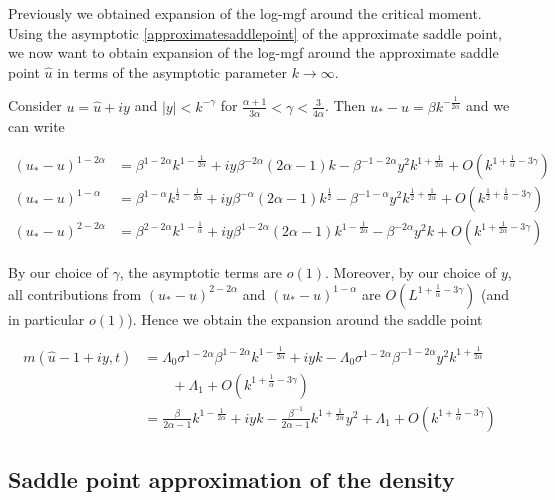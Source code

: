 \documentclass[12pt]{article}
\theoremstyle{plain}
\begin{document}
Previously we obtained expansion of the log-mgf around the critical moment. Using the asymptotic \eqref{approximatesaddlepoint} of the approximate saddle point, we now want to obtain expansion of the log-mgf around the approximate saddle point $\hat u$ in terms of the asymptotic parameter $k\rightarrow \infty$.

Consider $u = \hat u + iy$ and $|y|<k^{-\gamma}$ for $\frac{\alpha+1}{3\alpha}< \gamma < \frac{3}{4\alpha} $. Then $u_*-u=\beta k^{-\frac{1}{2\alpha}}$ and we can write

$$
\begin{array}{ll}
(u_*-u)^{1-2\alpha} &= \beta^{1-2\alpha}k^{1-\frac{1}{2\alpha}} + iy\beta^{-2\alpha}(2\alpha-1)k - \beta^{-1-2\alpha}y^2 k^{1+\frac{1}{2\alpha}} + O(k^{1+\frac 1\alpha -3\gamma})\\[5pt]
(u_*-u)^{1-\alpha} &= \beta^{1-\alpha}k^{\frac 12-\frac{1}{2\alpha}} + iy\beta^{-\alpha}(2\alpha-1)k^{\frac 12} - \beta^{-1-\alpha}y^2 k^{\frac 12+\frac{1}{2\alpha}} + O(k^{\frac 12+\frac 1\alpha-3\gamma})\\[5pt]
(u_*-u)^{2-2\alpha} &= \beta^{2-2\alpha}k^{1-\frac{1}{\alpha}} + iy\beta^{1-2\alpha}(2\alpha-1)k^{1-\frac{1}{2\alpha}} - \beta^{-2\alpha}y^2k + O(k^{1+\frac {1}{2\alpha}-3\gamma})
\end{array}
$$

By our choice of $\gamma$, the asymptotic terms are $o(1)$. Moreover, by our choice of $y$, all contributions from $(u_*-u)^{2-2\alpha}$ and $(u_*-u)^{1-\alpha}$ are $O(L^{1+\frac 1\alpha -3\gamma})$ (and in particular $o(1)$). Hence we obtain the expansion around the saddle point

\begin{equation}\label{logmgfexpansionaroundthesaddlepoint}
\begin{aligned}
m(\hat u - 1 + iy,t)&=\Lambda_0\sigma^{1-2\alpha}\beta^{1-2\alpha}k^{1-\frac{1}{2\alpha}} + iyk - \Lambda_0 \sigma ^{1-2\alpha} \beta^{-1-2\alpha} y^2 k^{1 + \frac{1}{2\alpha}} \\
&\qquad+ \Lambda_1 + O(k^{1+\frac 1\alpha -3\gamma})\\[10pt]
&=\frac{\beta}{2\alpha - 1} k ^ {1-\frac{1}{2\alpha}} + iyk - \frac{\beta^{-1}}{2\alpha - 1} k ^{1+\frac{1}{2\alpha}} y^2 + \Lambda_1+ O(k^{1+\frac 1\alpha -3\gamma})
\end{aligned}
\end{equation}

\subsection{Saddle point approximation of the density}
\end{document}
